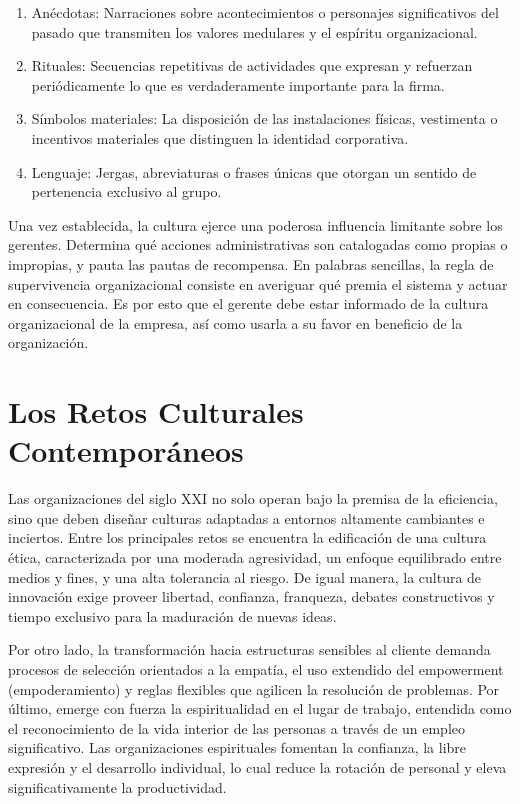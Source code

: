 \documentclass{article}
\begin{document}
    \begin{enumerate}
        \item Anécdotas: Narraciones sobre acontecimientos o personajes significativos del pasado que transmiten los valores medulares y el espíritu organizacional.
        \item Rituales: Secuencias repetitivas de actividades que expresan y refuerzan periódicamente lo que es verdaderamente importante para la firma.
        \item Símbolos materiales: La disposición de las instalaciones físicas, vestimenta o incentivos materiales que distinguen la identidad corporativa.
        \item Lenguaje: Jergas, abreviaturas o frases únicas que otorgan un sentido de pertenencia exclusivo al grupo.
    \end{enumerate}

    Una vez establecida, la cultura ejerce una poderosa influencia limitante sobre los gerentes. Determina qué acciones administrativas son catalogadas como propias o impropias, y pauta las pautas de recompensa. En palabras sencillas, la regla de supervivencia organizacional consiste en averiguar qué premia el sistema y actuar en consecuencia. Es por esto que el gerente debe estar informado de la cultura organizacional de la empresa, así como usarla a su favor en beneficio de la organización.

    \section{Los Retos Culturales Contemporáneos}
    Las organizaciones del siglo XXI no solo operan bajo la premisa de la eficiencia, sino que deben diseñar culturas adaptadas a entornos altamente cambiantes e inciertos. Entre los principales retos se encuentra la edificación de una cultura ética, caracterizada por una moderada agresividad, un enfoque equilibrado entre medios y fines, y una alta tolerancia al riesgo. De igual manera, la cultura de innovación exige proveer libertad, confianza, franqueza, debates constructivos y tiempo exclusivo para la maduración de nuevas ideas.

    Por otro lado, la transformación hacia estructuras sensibles al cliente demanda procesos de selección orientados a la empatía, el uso extendido del empowerment (empoderamiento) y reglas flexibles que agilicen la resolución de problemas. Por último, emerge con fuerza la espiritualidad en el lugar de trabajo, entendida como el reconocimiento de la vida interior de las personas a través de un empleo significativo. Las organizaciones espirituales fomentan la confianza, la libre expresión y el desarrollo individual, lo cual reduce la rotación de personal y eleva significativamente la productividad.
\end{document}
